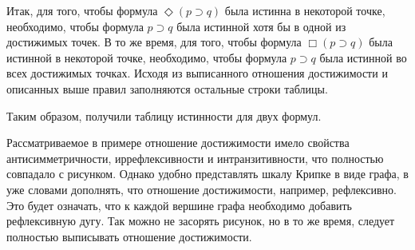 \begin{example}
    Итак, для того, чтобы формула $\Diamond(p \supset q)$ была истинна в некоторой точке, необходимо, чтобы формула $p \supset q$ была истинной хотя бы в одной из достижимых точек. В то же время, для того, чтобы формула $\Box(p \supset q)$ была истинной в некоторой точке, необходимо, чтобы формула $p \supset q$ была истинной во всех достижимых точках. Исходя из выписанного отношения достижимости и описанных выше правил заполняются остальные строки таблицы.

    Таким образом, получили таблицу истинности для двух формул.
\end{example}

\begin{remark}
    Рассматриваемое в примере отношение достижимости имело свойства антисимметричности, иррефлексивности и интранзитивности, что полностью совпадало с рисунком. Однако удобно представлять шкалу Крипке в виде графа, в уже словами дополнять, что отношение достижимости, например, рефлексивно. Это будет означать, что к каждой вершине графа необходимо добавить рефлексивную дугу. Так можно не засорять рисунок, но в то же время, следует полностью выписывать отношение достижимости.
\end{remark}
